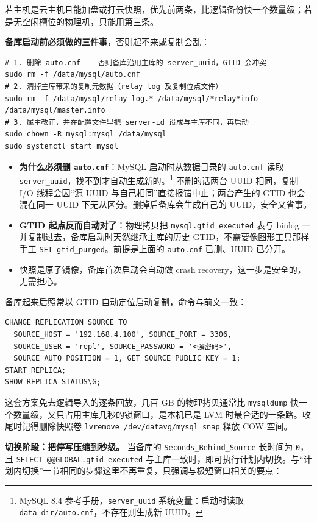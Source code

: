 \documentclass[12pt,UTF8]{ctexbook}
\begin{document}
若主机是云主机且能加盘或打云快照，优先前两条，比逻辑备份快一个数量级；若是无空闲槽位的物理机，只能用第三条。

\textbf{备库启动前必须做的三件事}，否则起不来或复制会乱：

\begin{lstlisting}
# 1. 删除 auto.cnf —— 否则备库沿用主库的 server_uuid，GTID 会冲突
sudo rm -f /data/mysql/auto.cnf
# 2. 清掉主库带来的复制元数据（relay log 及复制位点文件）
sudo rm -f /data/mysql/relay-log.* /data/mysql/*relay*info /data/mysql/master.info
# 3. 属主改正，并在配置文件里把 server-id 设成与主库不同，再启动
sudo chown -R mysql:mysql /data/mysql
sudo systemctl start mysql
\end{lstlisting}

\begin{itemize}[leftmargin=2cm]
  \item \textbf{为什么必须删 \texttt{auto.cnf}}：MySQL 启动时从数据目录的 \texttt{auto.cnf} 读取 \texttt{server\_uuid}，找不到才自动生成新的。\footnote{MySQL 8.4 参考手册，\texttt{server\_uuid} 系统变量：启动时读取 \texttt{data\_dir/auto.cnf}，不存在则生成新 UUID。} 不删的话两台 UUID 相同，复制 I/O 线程会因“源 UUID 与自己相同”直接报错中止；两台产生的 GTID 也会混在同一 UUID 下无从区分。删掉后备库会生成自己的 UUID，安全又省事。
  \item \textbf{GTID 起点反而自动对了}：物理拷贝把 \texttt{mysql.gtid\_executed} 表与 binlog 一并复制过去，备库启动时天然继承主库的历史 GTID，不需要像图形工具那样手工 \texttt{SET gtid\_purged}。前提是上面的 \texttt{auto.cnf} 已删、UUID 已分开。
  \item 快照是原子镜像，备库首次启动会自动做 crash recovery，这一步是安全的，无需担心。
\end{itemize}

备库起来后照常以 GTID 自动定位启动复制，命令与前文一致：

\begin{lstlisting}
CHANGE REPLICATION SOURCE TO
  SOURCE_HOST = '192.168.4.100', SOURCE_PORT = 3306,
  SOURCE_USER = 'repl', SOURCE_PASSWORD = '<强密码>',
  SOURCE_AUTO_POSITION = 1, GET_SOURCE_PUBLIC_KEY = 1;
START REPLICA;
SHOW REPLICA STATUS\G;
\end{lstlisting}

这套方案免去逻辑导入的逐条回放，几百 GB 的物理拷贝通常比 \texttt{mysqldump} 快一个数量级，又只占用主库几秒的锁窗口，是本机已是 LVM 时最合适的一条路。收尾时记得删除快照卷 \texttt{lvremove /dev/datavg/mysql\_snap} 释放 COW 空间。

\textbf{切换阶段：把停写压缩到秒级。} 当备库的 \texttt{Seconds\_Behind\_Source} 长时间为 \texttt{0}，且 \texttt{SELECT @@GLOBAL.gtid\_executed} 与主库一致时，即可执行计划内切换。与“计划内切换”一节相同的步骤这里不再重复，只强调与极短窗口相关的要点：
\end{document}
